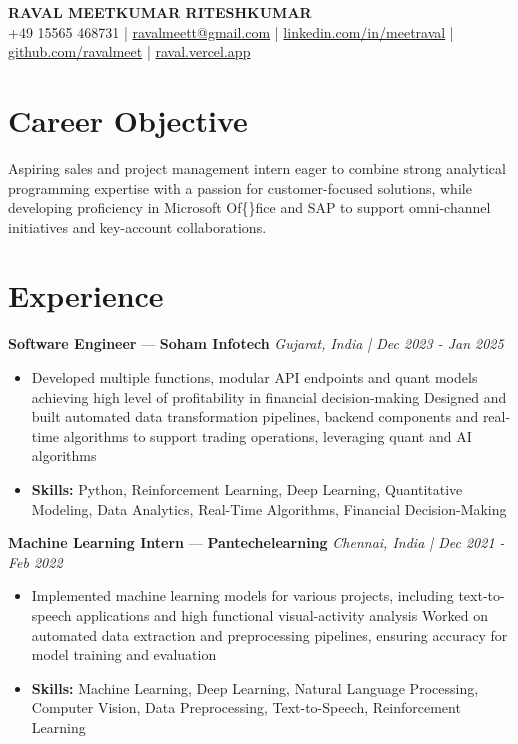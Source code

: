 \documentclass[a4paper,10pt]{article}
\begin{document}
\begin{center}
  {\Large\bfseries RAVAL MEETKUMAR RITESHKUMAR}\\[2pt]
  {\small +49 15565 468731 \;|\; \href{mailto:ravalmeett@gmail.com}{ravalmeett@gmail.com} \;|\; \href{https://www.linkedin.com/in/meetraval/}{linkedin.com/in/meetraval} \;|\; \href{https://github.com/ravalmeet}{github.com/ravalmeet} \;|\; \href{https://raval.vercel.app/}{raval.vercel.app}}
\end{center}
\vspace{-3pt}

\section*{Career Objective}
Aspiring sales and project management intern eager to combine strong analytical programming expertise with a passion for customer-focused solutions, while developing proficiency in Microsoft Of\{\}fice and SAP to support omni-channel initiatives and key-account collaborations.\par

\section*{Experience}
\textbf{Software Engineer} — \textbf{Soham Infotech} \hfill \textit{Gujarat, India \;|\; Dec 2023 - Jan 2025}\par
\vspace{1pt}
\begin{itemize}
  \item Developed multiple functions, modular API endpoints and quant models achieving high level of profitability in financial decision-making Designed and built automated data transformation pipelines, backend components and real-time algorithms to support trading operations, leveraging quant and AI algorithms
  \item \textbf{Skills:} Python, Reinforcement Learning, Deep Learning, Quantitative Modeling, Data Analytics, Real-Time Algorithms, Financial Decision-Making
\end{itemize}
\vspace{3pt}
\textbf{Machine Learning Intern} — \textbf{Pantechelearning} \hfill \textit{Chennai, India \;|\; Dec 2021 - Feb 2022}\par
\vspace{1pt}
\begin{itemize}
  \item Implemented machine learning models for various projects, including text-to-speech applications and high functional visual-activity analysis Worked on automated data extraction and preprocessing pipelines, ensuring accuracy for model training and evaluation
  \item \textbf{Skills:} Machine Learning, Deep Learning, Natural Language Processing, Computer Vision, Data Preprocessing, Text-to-Speech, Reinforcement Learning
\end{itemize}
\end{document}
